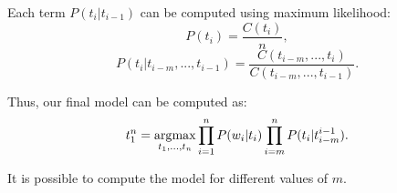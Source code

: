 Each term $P(t_i | t_{i-1})$ can be computed using maximum likelihood:
\begin{equation}
    P(t_i) = \frac{C(t_i)}{n},
\end{equation}
\begin{equation}
    P(t_i | t_{i-m}, ..., t_{i-1}) = \frac{C(t_{i-m}, ..., t_{i})}{C(t_{i-m}, ..., t_{i-1})}.
\end{equation}

Thus, our final model can be computed as:
\begin{equation}
    t_1^n = \operatorname*{arg\!\max}_{t_1, ..., t_n} \prod_{i=1}^n P(w_i | t_i) \prod_{i=m}^n P(t_i | t_{i-m}^{i-1}).
    \label{eq:model}
\end{equation}

It is possible to compute the model for different values of $m$.

